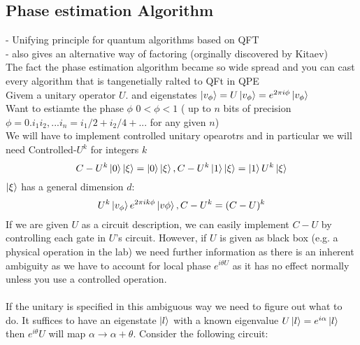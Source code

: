 \documentclass{article}
\begin{document}
\subsection{Phase estimation Algorithm}
- Unifying principle for quantum algorithms based on QFT\\
- also gives an alternative way of factoring (orginally discovered  by Kitaev)\\
The fact the phase estimation algorithm became so wide spread and you can cast every algorithm that is tangenetially ralted to QFt in QPE\\
Givem a unitary operator $U$. and eigenstates $\ket{v_{\phi}} = U\ket{v_{\phi}} = e^{2\pi i \phi} \ket{v_{\phi}}$\\
Want to estiamte the phase $\phi$ $0< \phi< 1$  ( up to $n$ bits of precision $\phi = 0. i_1 i_2,...i_n = i_1/2 + i_2/4 + ...$ for any given $n$)\\
We will have to implement controlled unitary opearotrs and in particular we will need Controlled-$U^k$ for integers $k$
$$
C-U^k \ket{0} \ket{\xi} = \ket{0}\ket{\xi}, C-U^k \ket{1}\ket{\xi} = \ket{1} U^k \ket{\xi}
$$
$\ket{\xi}$ has a general dimension $d$:
$$
U^k \ket{v_{\phi}} e^{2\pi i k \phi} \ket{v \phi}, C-U^k = (C-U)^k
$$
If we are given $U$ as a circuit description, we can easily implement $C-U$ by controlling each gate in $U$'s circuit. However, if $U$ is given as black box (e.g. a physical operation in the lab) we need further information as there is an inherent ambiguity as we have to account for local phase $e^{i\theta U}$ as it has no effect normally unless you use a controlled operation. \\\\
        If the unitary is specified in this ambiguous way we need to figure out what to do. It suffices to have an eigenstate $\ket{l}$ with a known eigenvalue $U\ket{l} = e^{i \alpha} \ket{l}$ then $e^{i \theta} U$ will map $\alpha \rightarrow \alpha + \theta$. Consider the following circuit:
       
\end{document}
